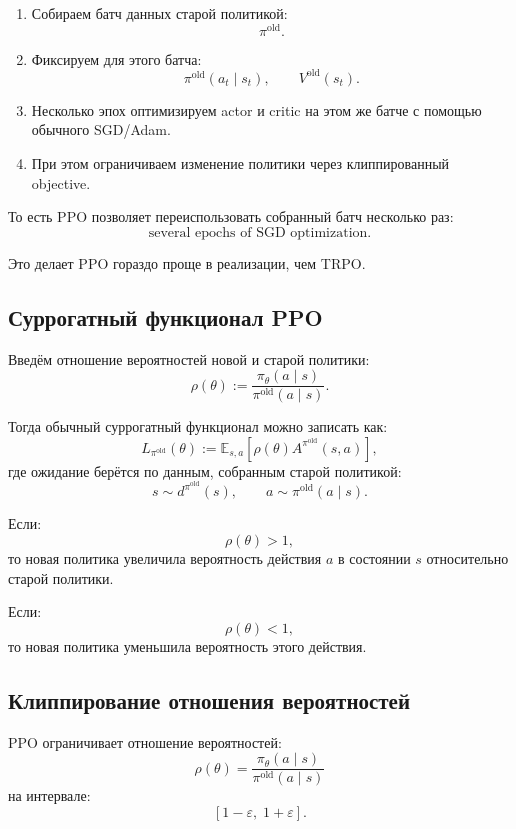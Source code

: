 \documentclass[12pt,a4paper]{article}
\begin{document}
\begin{enumerate}
    \item Собираем батч данных старой политикой:
    \[
    \pi^{\mathrm{old}}.
    \]

    \item Фиксируем для этого батча:
    \[
    \pi^{\mathrm{old}}(a_t\mid s_t),
    \qquad
    V^{\mathrm{old}}(s_t).
    \]

    \item Несколько эпох оптимизируем actor и critic на этом же батче с помощью обычного SGD/Adam.

    \item При этом ограничиваем изменение политики через клиппированный objective.
\end{enumerate}

То есть PPO позволяет переиспользовать собранный батч несколько раз:
\[
\text{several epochs of SGD optimization}.
\]

Это делает PPO гораздо проще в реализации, чем TRPO.

\subsection{Суррогатный функционал PPO}

Введём отношение вероятностей новой и старой политики:
\[
\rho(\theta)
:=
\frac{
\pi_\theta(a\mid s)
}{
\pi^{\mathrm{old}}(a\mid s)
}.
\]

Тогда обычный суррогатный функционал можно записать как:
\[
L_{\pi^{\mathrm{old}}}(\theta)
:=
\mathbb E_{s,a}
\left[
\rho(\theta)
A^{\pi^{\mathrm{old}}}(s,a)
\right],
\]
где ожидание берётся по данным, собранным старой политикой:
\[
s\sim d^{\pi^{\mathrm{old}}}(s),
\qquad
a\sim\pi^{\mathrm{old}}(a\mid s).
\]

Если:
\[
\rho(\theta)>1,
\]
то новая политика увеличила вероятность действия $a$ в состоянии $s$ относительно старой политики.

Если:
\[
\rho(\theta)<1,
\]
то новая политика уменьшила вероятность этого действия.

\subsection{Клиппирование отношения вероятностей}

PPO ограничивает отношение вероятностей:
\[
\rho(\theta)
=
\frac{
\pi_\theta(a\mid s)
}{
\pi^{\mathrm{old}}(a\mid s)
}
\]
на интервале:
\[
[1-\varepsilon,\;1+\varepsilon].
\]
\end{document}
